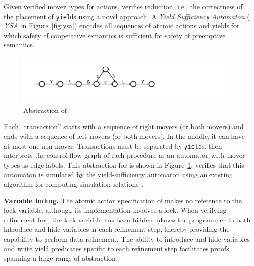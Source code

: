 Given verified mover types for actions, \civl verifies reduction, i.e., the correctness of the placement of {\tt yield}s using a novel  approach.
A {\em Yield Sufficiency Automaton\/} ($\mathit{YSA}$ in Figure~\ref{fig:ysa}) encodes all sequences of atomic actions and yields for which safety of cooperative semantics is sufficient 
for safety of preemptive semantics. 
\begin{figure}
\begin{center}
\includegraphics[scale=0.25]{WBSlow.pdf}
\end{center}
\vspace*{-0.2cm}
\caption{Abstraction of }
\label{fig:midwb}
\end{figure}
Each ``transaction'' starts with a sequence of right movers (or both movers) and ends with a sequence of left movers (or both movers).
In the middle, it can have at most one non mover. Transactions must be
separated by {\tt yield}s.
\civl then interprets the control-flow graph of each procedure as an automaton with mover types as edge labels. 
This abstraction for  is shown in Figure~\ref{fig:midwb}.
\civl verifies that this automaton is simulated by the yield-sufficiency automaton using an existing algorithm for computing simulation relations~\cite{HenzingerHK95}.

{\bf Variable hiding.}
The atomic action specification of  makes no reference to the lock variable, although its implementation involves a lock. 
When verifying refinement for , the lock variable has been hidden. 
\civl allows the programmer to both introduce and hide variables in
each refinement step, thereby providing the capability to perform data refinement.
The ability to introduce and hide variables and write yield predicates specific to each refinement step 
facilitates proofs spanning a large range of abstraction.

%


